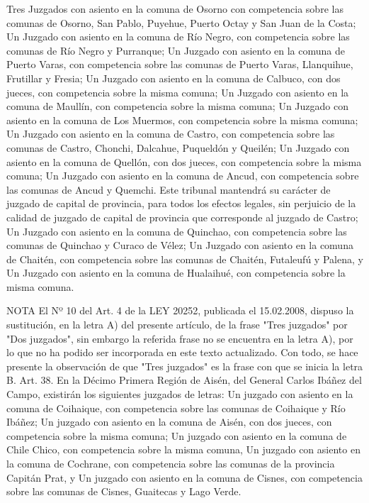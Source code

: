     Tres Juzgados con asiento en la comuna de Osorno con competencia sobre las comunas de Osorno, San Pablo, Puyehue, Puerto Octay y San Juan de la Costa;
    Un Juzgado con asiento en la comuna de Río Negro, con competencia sobre las comunas de Río Negro y Purranque;
    Un Juzgado con asiento en la comuna de Puerto Varas, con competencia sobre las comunas de Puerto Varas, Llanquihue, Frutillar y Fresia;
    Un Juzgado con asiento en la comuna de Calbuco, con dos jueces, con competencia sobre la misma comuna;
    Un Juzgado con asiento en la comuna de Maullín, con competencia sobre la misma comuna;
    Un Juzgado con asiento en la comuna de Los Muermos, con competencia sobre la misma comuna;
    Un Juzgado con asiento en la comuna de Castro, con competencia sobre las comunas de Castro, Chonchi, Dalcahue, Puqueldón y Queilén;
    Un Juzgado con asiento en la comuna de Quellón, con dos jueces, con competencia sobre la misma comuna;
    Un Juzgado con asiento en la comuna de Ancud, con competencia sobre las comunas de Ancud y Quemchi. Este tribunal mantendrá su carácter de juzgado de capital de provincia, para todos los efectos legales, sin perjuicio de la calidad de juzgado de capital de provincia que corresponde al juzgado de Castro;
    Un Juzgado con asiento en la comuna de Quinchao, con competencia sobre las comunas de Quinchao y Curaco de Vélez;
    Un Juzgado con asiento en la comuna de Chaitén, con competencia sobre las comunas de Chaitén, Futaleufú y Palena, y
    Un Juzgado con asiento en la comuna de Hualaihué, con competencia sobre la misma comuna.




NOTA
    El Nº 10 del Art. 4 de la LEY 20252, publicada el 15.02.2008, dispuso la sustitución, en la letra A) del presente artículo, de la frase "Tres juzgados" por "Dos juzgados", sin embargo la referida frase no se encuentra en la letra A), por lo que no ha podido ser incorporada en este texto actualizado. Con todo, se hace presente la observación de que "Tres juzgados" es la frase con que se inicia la letra B.
    Art. 38. En la Décimo Primera Región de Aisén, del General Carlos Ibáñez del Campo, existirán los siguientes juzgados de letras:
    Un juzgado con asiento en la comuna de Coihaique, con competencia sobre las comunas de Coihaique y Río Ibáñez;
    Un juzgado con asiento en la comuna de Aisén, con dos jueces, con competencia sobre la misma comuna;
    Un juzgado con asiento en la comuna de Chile Chico, con competencia sobre la misma comuna,
    Un juzgado con asiento en la comuna de Cochrane, con competencia sobre las comunas de la provincia Capitán Prat, y
    Un juzgado con asiento en la comuna de Cisnes, con competencia sobre las comunas de Cisnes, Guaitecas y Lago Verde.


